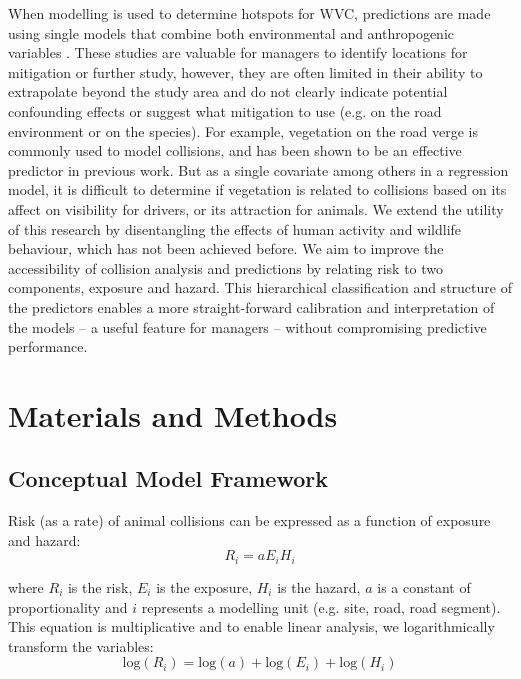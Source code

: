 When modelling is used to determine hotspots for WVC, predictions are made using single models that combine both environmental and anthropogenic variables \citep[e.g.][]{malo04,ramp05,gome08,roge09,hoth12,bart14,meis14,snow14}. These studies are valuable for managers to identify locations  for mitigation or further study, however, they are often limited in their ability to extrapolate beyond the study area and do not clearly indicate potential confounding effects or suggest what mitigation to use (e.g. on the road environment or on the species). For example, vegetation on the road verge is commonly used to model collisions, and has been shown to be an effective predictor in previous work.  But as a single covariate among others in a regression model, it is difficult to determine if vegetation is related to collisions based on its affect on visibility for drivers, or its attraction for animals. We extend the utility of this research by disentangling the effects of human activity and wildlife behaviour, which has not been achieved before. We aim to improve the accessibility of collision analysis and predictions by relating risk to two components, exposure and hazard. This hierarchical classification and structure of the predictors enables a more straight-forward calibration and interpretation of the models -- a useful feature for managers -- without compromising predictive performance.

\section{Materials and Methods}

\subsection{Conceptual Model Framework}
Risk (as a rate) of animal collisions can be expressed as a function of exposure and hazard: 
\begin{equation} \label{eq:21}
R_i=aE_iH_i
\end{equation}

where $R_i$ is the risk, $E_i$ is the exposure, $H_i$ is the hazard, $a$ is a constant of proportionality and $i$ represents a modelling unit (e.g. site, road, road segment). This equation is multiplicative and to enable linear analysis, we logarithmically transform the variables: 
\begin{equation} \label{eq:22}
\text{log}(R_i)=\text{log}(a)+\text{log}(E_i)+\text{log}(H_i)
\end{equation}

